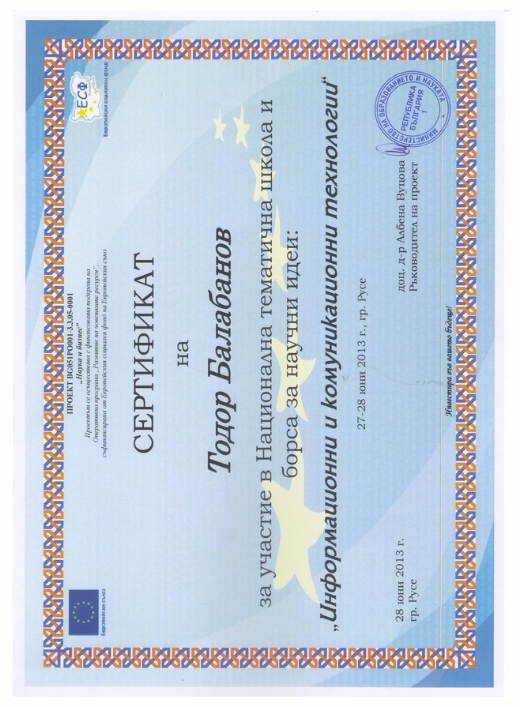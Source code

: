 \documentclass[english,a4paper]{europasscv}
\begin{document}
\includegraphics[width=\textwidth,height=\textheight,keepaspectratio]{Rouse2013}
\end{document}
